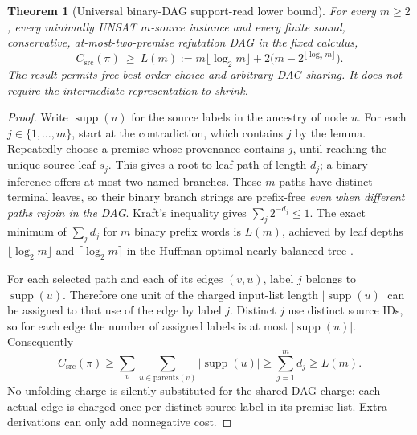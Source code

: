 \documentclass[11pt]{article}
\newtheorem{theorem}{Theorem}
\newcommand{\supp}{\operatorname{supp}}
\begin{document}
\begin{theorem}[Universal binary-DAG support-read lower bound]
For every $m\ge2$, every minimally UNSAT $m$-source instance and every finite sound, conservative, at-most-two-premise refutation DAG in the fixed calculus,
\[
 C_{\mathrm{src}}(\pi)\ \ge\
 L(m):=m\lfloor\log_2m\rfloor+
 2\bigl(m-2^{\lfloor\log_2m\rfloor}\bigr).
\tag{1}
\]
The result permits free best-order choice and arbitrary DAG sharing. It does not require the intermediate representation to shrink.
\end{theorem}
\begin{proof}
Write $\supp(u)$ for the source labels in the ancestry of node $u$. For each $j\in\{1,\ldots,m\}$, start at the contradiction, which contains $j$ by the lemma. Repeatedly choose a premise whose provenance contains $j$, until reaching the unique source leaf $s_j$. This gives a root-to-leaf path of length $d_j$; a binary inference offers at most two named branches. These $m$ paths have distinct terminal leaves, so their binary branch strings are prefix-free \emph{even when different paths rejoin in the DAG}. Kraft's inequality gives $\sum_j2^{-d_j}\le1$. The exact minimum of $\sum_jd_j$ for $m$ binary prefix words is $L(m)$, achieved by leaf depths $\lfloor\log_2m\rfloor$ and $\lceil\log_2m\rceil$ in the Huffman-optimal nearly balanced tree \cite{Huffman1952}.

For each selected path and each of its edges $(v,u)$, label $j$ belongs to $\supp(u)$. Therefore one unit of the charged input-list length $|\supp(u)|$ can be assigned to that use of the edge by label $j$. Distinct $j$ use distinct source IDs, so for each edge the number of assigned labels is at most $|\supp(u)|$. Consequently
\[
 C_{\mathrm{src}}(\pi)\ge
 \sum_{v}\sum_{u\in\mathrm{parents}(v)}|\supp(u)|
 \ge\sum_{j=1}^m d_j\ge L(m).
\]
No unfolding charge is silently substituted for the shared-DAG charge: each actual edge is charged once per distinct source label in its premise list. Extra derivations can only add nonnegative cost.
\end{proof}
\end{document}
